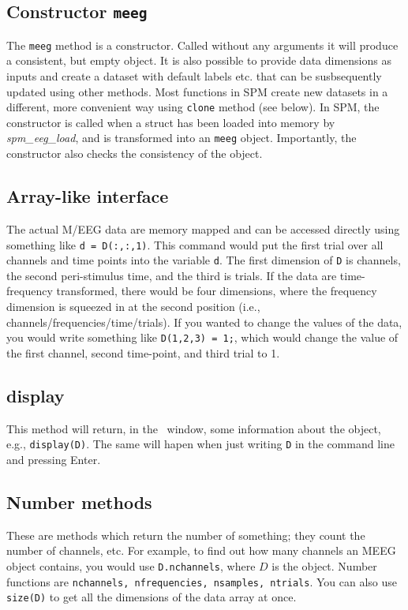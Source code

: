 \subsection{Constructor \texttt{meeg}}
The \texttt{meeg} method is a constructor. Called without any arguments it will produce a consistent, but empty object. It is also possible to provide data dimensions as inputs and create a dataset with default labels etc. that can be susbsequently updated using other methods. Most functions in SPM create new datasets in a different, more convenient way using \texttt{clone} method (see below).  In SPM, the constructor is called when a struct has been loaded into memory by \textit{spm\_eeg\_load}, and is transformed into an \texttt{meeg} object. Importantly, the constructor also checks the consistency of the object. 

\subsection{Array-like interface}
The actual M/EEG data are memory mapped and can be accessed directly using something like \texttt{d = D(:,:,1)}. This command would put the first trial over all channels and time points into the variable \texttt{d}. The first dimension of \texttt{D} is channels, the second peri-stimulus time, and the third is trials. If the data are time-frequency transformed, there would be four dimensions, where the frequency dimension is squeezed in at the second position (i.e., channels/frequencies/time/trials). If you wanted to change the values of the data, you would write something like \texttt{D(1,2,3) = 1;}, which would change the value of the first channel, second time-point, and third trial to 1.

\subsection{display}
This method will return, in the \matlab\ window, some information about the object, e.g., \texttt{display(D)}. The same will hapen when just writing \texttt{D} in the command line and pressing Enter.

\subsection{Number methods}
These are methods which return the number of something; they count the number of channels, etc. For example, to find out how many channels an MEEG object contains, you would use \texttt{D.nchannels}, where $D$ is the object. Number functions are \texttt{nchannels, nfrequencies, nsamples, ntrials}. You can also use \texttt{size(D)} to get all the dimensions of the data array at once.

